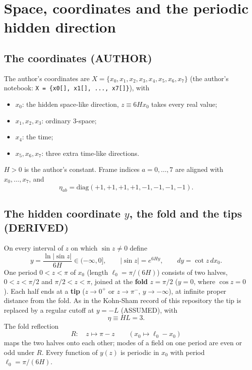 \documentclass[
  10pt,
]{article}
\providecommand{\tightlist}{%
  \setlength{\itemsep}{0pt}\setlength{\parskip}{0pt}}
\begin{document}
\hypertarget{space-coordinates-and-the-periodic-hidden-direction}{%
\section{Space, coordinates and the periodic hidden
direction}\label{space-coordinates-and-the-periodic-hidden-direction}}

\hypertarget{the-coordinates-author}{%
\subsection{The coordinates (AUTHOR)}\label{the-coordinates-author}}

The author's coordinates are
\(X = \{x_0, x_1, x_2, x_3, x_4, x_5, x_6, x_7\}\) (the author's
notebook: \texttt{X\ =\ \{x0{[}{]},\ x1{[}{]},\ ...,\ x7{[}{]}\}}), with

\begin{itemize}
\tightlist
\item
  \(x_0\): the hidden space-like direction, \(z \equiv 6Hx_0\) takes
  every real value;
\item
  \(x_1, x_2, x_3\): ordinary 3-space;
\item
  \(x_4\): the time;
\item
  \(x_5, x_6, x_7\): three extra time-like directions.
\end{itemize}

\(H > 0\) is the author's constant. Frame indices \(a = 0, \dots, 7\)
are aligned with \(x_0, \dots, x_7\), and
\[\eta_{ab} = \mathrm{diag}(+1, +1, +1, +1, -1, -1, -1, -1).\]

\hypertarget{the-hidden-coordinate-y-the-fold-and-the-tips-derived}{%
\subsection{\texorpdfstring{The hidden coordinate \(y\), the fold and
the tips
(DERIVED)}{The hidden coordinate y, the fold and the tips (DERIVED)}}\label{the-hidden-coordinate-y-the-fold-and-the-tips-derived}}

On every interval of \(z\) on which \(\sin z \neq 0\) define
\[ y = \frac{\ln|\sin z|}{6H} \in (-\infty, 0], \qquad |\sin z| = e^{6Hy}, \qquad dy = \cot z\, dx_0 .\]
One period \(0 < z < \pi\) of \(x_0\) (length \(\ell_0 = \pi/(6H)\))
consists of two halves, \(0 < z < \pi/2\) and \(\pi/2 < z < \pi\),
joined at the \textbf{fold} \(z = \pi/2\) (\(y = 0\), where
\(\cos z = 0\)). Each half ends at a \textbf{tip} (\(z \to 0^+\) or
\(z \to \pi^-\), \(y \to -\infty\)), at infinite proper distance from
the fold. As in the Kohn-Sham record of this repository the tip is
replaced by a regular cutoff at \(y = -L\) (ASSUMED), with
\[ \eta \equiv HL = 3 .\] The fold reflection
\[ R:\quad z \mapsto \pi - z \qquad (x_0 \mapsto \ell_0 - x_0)\] maps
the two halves onto each other; modes of a field on one period are even
or odd under \(R\). Every function of \(y(z)\) is periodic in \(x_0\)
with period \(\ell_0 = \pi/(6H)\).
\end{document}
